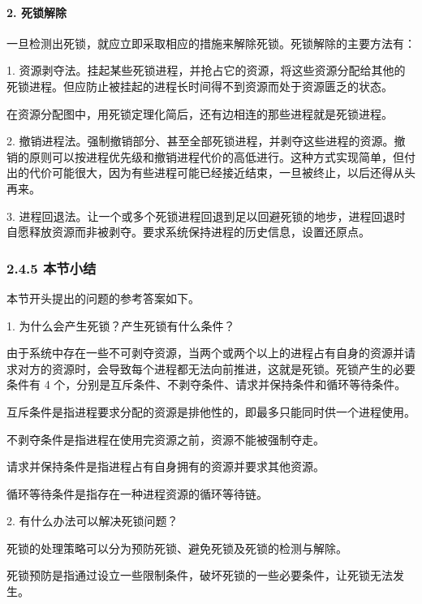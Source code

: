 \documentclass{ctexbook}
\begin{document}
		\paragraph{2. 死锁解除}
		
		一旦检测出死锁，就应立即采取相应的措施来解除死锁。死锁解除的主要方法有：
		
		1. 资源剥夺法。挂起某些死锁进程，并抢占它的资源，将这些资源分配给其他的死锁进程。但应防止被挂起的进程长时间得不到资源而处于资源匮乏的状态。
		
		\begin{tcolorbox}[colback=gray!10, colframe=black!50, title=注意]
			在资源分配图中，用死锁定理化简后，还有边相连的那些进程就是死锁进程。
		\end{tcolorbox}
		
		2. 撤销进程法。强制撤销部分、甚至全部死锁进程，并剥夺这些进程的资源。撤销的原则可以按进程优先级和撤销进程代价的高低进行。这种方式实现简单，但付出的代价可能很大，因为有些进程可能已经接近结束，一旦被终止，以后还得从头再来。
		
		3. 进程回退法。让一个或多个死锁进程回退到足以回避死锁的地步，进程回退时自愿释放资源而非被剥夺。要求系统保持进程的历史信息，设置还原点。
		
		\subsubsection{2.4.5 本节小结}
		
		本节开头提出的问题的参考答案如下。
		
		1. 为什么会产生死锁？产生死锁有什么条件？
		
		由于系统中存在一些不可剥夺资源，当两个或两个以上的进程占有自身的资源并请求对方的资源时，会导致每个进程都无法向前推进，这就是死锁。死锁产生的必要条件有 4 个，分别是互斥条件、不剥夺条件、请求并保持条件和循环等待条件。
		
		互斥条件是指进程要求分配的资源是排他性的，即最多只能同时供一个进程使用。
		
		不剥夺条件是指进程在使用完资源之前，资源不能被强制夺走。
		
		请求并保持条件是指进程占有自身拥有的资源并要求其他资源。
		
		循环等待条件是指存在一种进程资源的循环等待链。
		
		2. 有什么办法可以解决死锁问题？
		
		死锁的处理策略可以分为预防死锁、避免死锁及死锁的检测与解除。
		
		死锁预防是指通过设立一些限制条件，破坏死锁的一些必要条件，让死锁无法发生。
		
\end{document}
